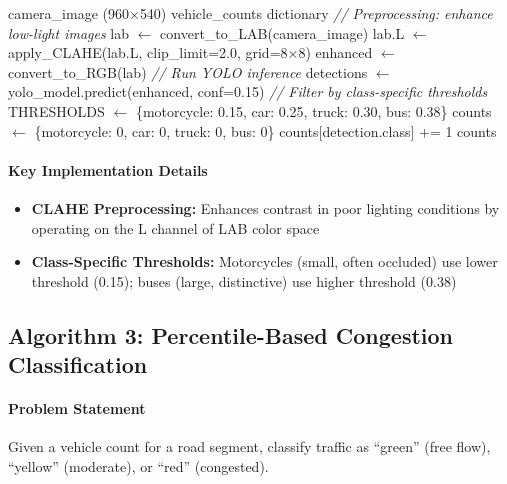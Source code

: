\begin{algorithm}[H]
\caption{YOLO Vehicle Detection}
\begin{algorithmic}[1]
\REQUIRE camera\_image (960$\times$540)
\ENSURE vehicle\_counts dictionary
\STATE \textit{// Preprocessing: enhance low-light images}
\STATE lab $\gets$ convert\_to\_LAB(camera\_image)
\STATE lab.L $\gets$ apply\_CLAHE(lab.L, clip\_limit=2.0, grid=8×8)
\STATE enhanced $\gets$ convert\_to\_RGB(lab)
\STATE \textit{// Run YOLO inference}
\STATE detections $\gets$ yolo\_model.predict(enhanced, conf=0.15)
\STATE \textit{// Filter by class-specific thresholds}
\STATE THRESHOLDS $\gets$ \{motorcycle: 0.15, car: 0.25, truck: 0.30, bus: 0.38\}
\STATE counts $\gets$ \{motorcycle: 0, car: 0, truck: 0, bus: 0\}
        \STATE counts[detection.class] += 1
    \ENDIF
\ENDFOR
\RETURN counts
\end{algorithmic}
\end{algorithm}

\paragraph{Key Implementation Details}
\begin{itemize}[noitemsep]
    \item \textbf{CLAHE Preprocessing:} Enhances contrast in poor lighting conditions by operating on the L channel of LAB color space
    \item \textbf{Class-Specific Thresholds:} Motorcycles (small, often occluded) use lower threshold (0.15); buses (large, distinctive) use higher threshold (0.38)
\end{itemize}

\subsection{Algorithm 3: Percentile-Based Congestion Classification}

\paragraph{Problem Statement}
Given a vehicle count for a road segment, classify traffic as ``green'' (free flow), ``yellow'' (moderate), or ``red'' (congested).

